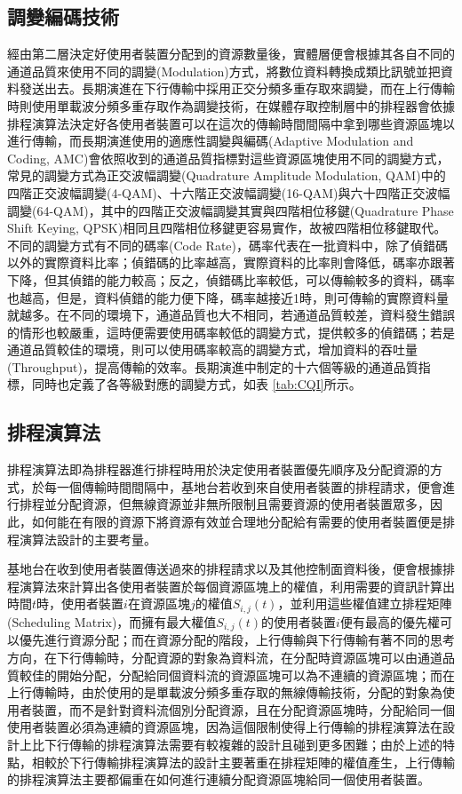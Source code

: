 \subsection{調變編碼技術}
經由第二層決定好使用者裝置分配到的資源數量後，實體層便會根據其各自不同的通道品質來使用不同的調變(Modulation)方式，將數位資料轉換成類比訊號並把資料發送出去。長期演進在下行傳輸中採用正交分頻多重存取來調變，而在上行傳輸時則使用單載波分頻多重存取作為調變技術，在媒體存取控制層中的排程器會依據排程演算法決定好各使用者裝置可以在這次的傳輸時間間隔中拿到哪些資源區塊以進行傳輸，而長期演進使用的適應性調變與編碼(Adaptive Modulation and Coding, AMC)會依照收到的通道品質指標對這些資源區塊使用不同的調變方式，常見的調變方式為正交波幅調變(Quadrature Amplitude Modulation, QAM)中的四階正交波幅調變(4-QAM)、十六階正交波幅調變(16-QAM)與六十四階正交波幅調變(64-QAM)，其中的四階正交波幅調變其實與四階相位移鍵(Quadrature Phase Shift Keying, QPSK)相同且四階相位移鍵更容易實作，故被四階相位移鍵取代。不同的調變方式有不同的碼率(Code Rate)，碼率代表在一批資料中，除了偵錯碼以外的實際資料比率；偵錯碼的比率越高，實際資料的比率則會降低，碼率亦跟著下降，但其偵錯的能力較高；反之，偵錯碼比率較低，可以傳輸較多的資料，碼率也越高，但是，資料偵錯的能力便下降，碼率越接近1時，則可傳輸的實際資料量就越多。在不同的環境下，通道品質也大不相同，若通道品質較差，資料發生錯誤的情形也較嚴重，這時便需要使用碼率較低的調變方式，提供較多的偵錯碼；若是通道品質較佳的環境，則可以使用碼率較高的調變方式，增加資料的吞吐量(Throughput)，提高傳輸的效率。長期演進中制定的十六個等級的通道品質指標，同時也定義了各等級對應的調變方式，如表 \ref{tab:CQI}所示。
\subsection{排程演算法}
排程演算法即為排程器進行排程時用於決定使用者裝置優先順序及分配資源的方式，於每一個傳輸時間間隔中，基地台若收到來自使用者裝置的排程請求，便會進行排程並分配資源，但無線資源並非無所限制且需要資源的使用者裝置眾多，因此，如何能在有限的資源下將資源有效並合理地分配給有需要的使用者裝置便是排程演算法設計的主要考量。

基地台在收到使用者裝置傳送過來的排程請求以及其他控制面資料後，便會根據排程演算法來計算出各使用者裝置於每個資源區塊上的權值，利用需要的資訊計算出時間$t$時，使用者裝置$i$在資源區塊$j$的權值$S_{i,j}(t)$，並利用這些權值建立排程矩陣(Scheduling Matrix)，而擁有最大權值$S_{i,j}(t)$的使用者裝置$i$便有最高的優先權可以優先進行資源分配；而在資源分配的階段，上行傳輸與下行傳輸有著不同的思考方向，在下行傳輸時，分配資源的對象為資料流，在分配時資源區塊可以由通道品質較佳的開始分配，分配給同個資料流的資源區塊可以為不連續的資源區塊；而在上行傳輸時，由於使用的是單載波分頻多重存取的無線傳輸技術，分配的對象為使用者裝置，而不是針對資料流個別分配資源，且在分配資源區塊時，分配給同一個使用者裝置必須為連續的資源區塊，因為這個限制使得上行傳輸的排程演算法在設計上比下行傳輸的排程演算法需要有較複雜的設計且碰到更多困難；由於上述的特點，相較於下行傳輸排程演算法的設計主要著重在排程矩陣的權值產生，上行傳輸的排程演算法主要都偏重在如何進行連續分配資源區塊給同一個使用者裝置。

